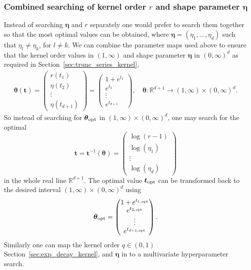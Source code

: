 \documentclass{svjour3}                     %
\newcommand{\bm}[1]{\boldsymbol{#1}}
\newcommand{\reals}{\mathbb{R}}
\newcommand{\veta}{{\bm{\eta}}}
\newcommand{\vtheta}{{\bm{\theta}}}
\newcommand{\vt}{\bm{t}}
\newcommand\secref{Section~\ref}
\begin{document}
\subsubsection{Combined searching of kernel order $r$ and shape parameter $\veta$}
Instead of searching $\veta$ and $r$ separately one would prefer to search them together so that the most optimal values can be obtained, where $\veta = (\eta_1, \dots, \eta_d)$ such that $\eta_l \ne \eta_k$,  for $l \ne k$.
We can combine the parameter maps used above to ensure that the kernel order values in $(1, \infty)$ and shape parameter $\veta$ in $(0,\infty)^d$ as required in \secref{sec:trunc_series_kernel},
\begin{align*}
\vtheta(\vt) = 
\begin{pmatrix}
r(t_{1}) \\ \eta(t_2) \\ \vdots \\ \eta(t_{d+1}) 
\end{pmatrix} =
\begin{pmatrix}
1 + e^{t_1} \\ e^{t_2} \\ \vdots \\ e^{t_{d+1}}
\end{pmatrix}, 
\quad
\vtheta: \reals^{d+1} \to (1,\infty) \times (0,\infty)^d .
\end{align*}
So instead of searching for $\vtheta_{\textup{opt}}$ in $(1,\infty) \times (0,\infty)^d$, one may search for the optimal 
$$
\vt = \vt^{-1} (\vtheta) = 
\begin{pmatrix}
\log(r-1) \\ \log(\eta_1) \\ \vdots \\ \log(\eta_d)
\end{pmatrix}
$$ in the whole real line $\reals^{d+1}$.
The optimal value $\vt_{\textup{opt}}$ can be transformed back to the desired interval $(1,\infty) \times (0,\infty)^d$ using 
\begin{align*}
\vtheta_{\textup{opt}} = 
\begin{pmatrix}
1 + e^{t_{1, \textup{opt}}} \\
e^{t_{2, \textup{opt}}} \\
\vdots \\
e^{t_{d+1, \textup{opt}}} \\
\end{pmatrix}.
\end{align*}
Similarly one can map the kernel order $q \in (0,1)$ \secref{sec:exp_decay_kernel}, and $\veta$ in to a multivariate hyperparameter search.
\end{document}

